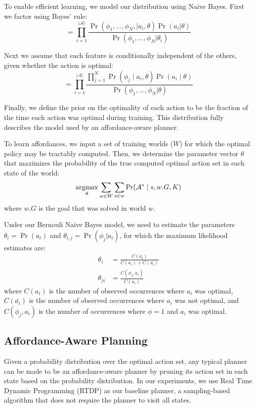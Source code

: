 \documentclass[letterpaper]{article}
\newcommand{\argmax}{\operatornamewithlimits{argmax}} %
\begin{document}
To enable efficient learning, we model our distribution using Naive
Bayes. First we factor using Bayes' rule:
\begin{equation}
= \prod_{i=1}^{|\mathcal{A}|} \frac{\Pr(\phi_1, \ldots, \phi_{N}, \mid a_i, \theta) \Pr(a_i | \theta)}{\Pr(\phi_1, \ldots, \phi_{N} | \theta_i)}
\label{eq:bayes}
\end{equation}

Next we assume that each feature is conditionally independent of the others, given whether the action is optimal:
\begin{equation}
= \prod_{i=1}^{|\mathcal{A}|} \frac{\prod_{j=1}^{N} \Pr(\phi_j \mid a_i, \theta) \Pr(a_i \mid \theta) }{\Pr(\phi_1, \ldots, \phi_{N} | \theta)}
\label{eq:final}
\end{equation}

Finally, we define the prior on the optimality of each action to be the fraction of the
time each action was optimal during training. This distribution fully describes the model used by an affordance-aware planner. 

To learn affordances, we input a set of training worlds ($W$) for which the optimal policy
may be tractably computed. Then, we determine the parameter vector $\theta$ that 
maximizes the probability of the true computed optimal action set in each state of the world:
\begin{equation}
\argmax_\theta \sum_{w \in W} \sum_{s \in w} \Pr(\mathcal{A}^* \mid s, w.G, K)
\end{equation}
where $w.G$ is the goal that was solved in world $w$.

Under our Bernouli Naive Bayes model, we need to estimate the parameters
$\theta_i = \Pr(a_i)$ and $\theta_{i,j} = \Pr(\phi_j | a_i)$, for which the maximum likelihood estimates are:
\begin{align}
\theta_i &= \frac{C(a_i)}{C(a_i) + C(\bar{a_i})} \\
\theta_{ji} &= \frac{C(\phi_j, a_i)}{C(a_i)}
\end{align}
where $C(a_i)$ is the number of observed occurrences where $a_i$ was optimal,
$C(\bar{a_i})$ is the number of observed occurrences where $a_i$ was not optimal,
and $C(\phi_j, a_i)$ is the number of occurrences where $\phi=1$ and $a_i$ was optimal.

\subsection{Affordance-Aware Planning}
\label{sec:action_pruning}
Given a probability distribution over the optimal action set, any
typical planner can be made to be an affordance-aware planner by
pruning its action set in each state based on the probability
distribution. In our experiments, we use Real Time Dynamic Programming
(RTDP) as our baseline planner, a sampling-based algorithm that does
not require the planner to visit all states.
\end{document}
